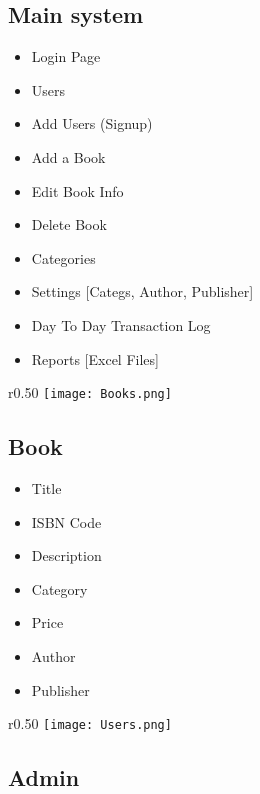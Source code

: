 \documentclass[landscape,a4paper,]{beamer}
\newcommand\mysubheading[1]{%
  \par\bigskip
  {\Medium\bfseries#1}\par\smallskip}
\begin{document}
\subsection{Main system}
\label{sec:orgbd99333}
\mysubheading{\insertsubsectionhead}
\begin{itemize}
\item Login Page
\item Users
\item Add Users (Signup)
\item Add a Book
\item Edit Book Info
\item Delete Book
\item Categories
\item Settings [Categs, Author, Publisher]
\item Day To Day Transaction Log
\item Reports [Excel Files]
\end{itemize}

\newpage

\begin{wrapfigure}{r}{0.50\textwidth}
    \texttt{[image: Books.png]}
    \label{fig:wrapfig}
\end{wrapfigure}
\subsection{Book}
\label{sec:org56fa84e}
\mysubheading{\insertsubsectionhead}


\begin{itemize}
\item Title
\item ISBN Code
\item Description
\item Category
\item Price
\item Author
\item Publisher
\end{itemize}

\begin{wrapfigure}{r}{0.50\textwidth}
    \texttt{[image: Users.png]}
    \label{fig:wrapfig}
\end{wrapfigure}

\subsection{Admin}
\label{sec:org8df7786}
\mysubheading{\insertsubsectionhead}
\end{document}
